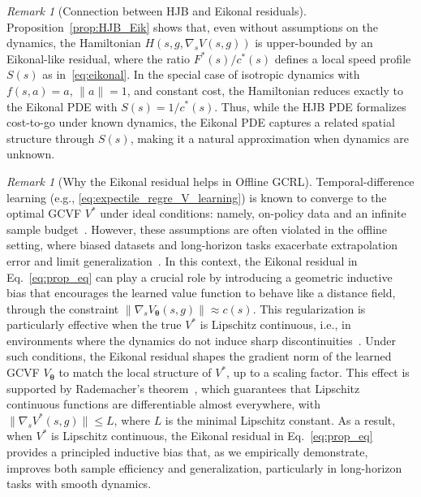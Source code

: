 \documentclass{article}
\theoremstyle{plain}
\theoremstyle{definition}
\theoremstyle{remark}
\newtheorem{remark}[theorem]{Remark}
\begin{document}
\begin{remark}[Connection between HJB and Eikonal residuals]
    Proposition~\ref{prop:HJB_Eik} shows that, even without assumptions on the dynamics, the Hamiltonian \( H(s, g, \nabla_s V(s, g)) \) is upper-bounded by an Eikonal-like residual, where the ratio \( F^*(s) / c^*(s) \) defines a local speed profile \( S(s) \) as in~\eqref{eq:eikonal}. In the special case of isotropic dynamics with \( f(s,a) = a \), \( \|a\| = 1 \), and constant cost, the Hamiltonian reduces exactly to the Eikonal PDE with \( S(s) = 1 / c^*(s) \). Thus, while the HJB PDE formalizes cost-to-go under known dynamics, the Eikonal PDE captures a related spatial structure through \( S(s) \), making it a natural approximation when dynamics are unknown.
\end{remark}

\begin{remark}[Why the Eikonal residual helps in Offline GCRL]
\label{remark_crucial}
    Temporal-difference learning (e.g., \eqref{eq:expectile_regre_V_learning}) is known to converge to the optimal GCVF \( V^* \) under ideal conditions: namely, on-policy data and an infinite sample budget~\cite{sutton2018reinforcement}. However, these assumptions are often violated in the offline setting, where biased datasets and long-horizon tasks exacerbate extrapolation error and limit generalization~\cite{park2024hiql}. In this context, the Eikonal residual in Eq.~\eqref{eq:prop_eq} can play a crucial role by introducing a geometric inductive bias that encourages the learned value function to behave like a distance field, through the constraint \( \|\nabla_s V_{\bm{\theta}}(s, g)\| \approx c(s) \). This regularization is particularly effective when the true \( V^* \) is Lipschitz continuous, i.e., in environments where the dynamics do not induce sharp discontinuities~\cite{banjanin2019nonsmooth}. Under such conditions, the Eikonal residual shapes the gradient norm of the learned GCVF \( V_{\bm{\theta}} \) to match the local structure of \( V^* \), up to a scaling factor. This effect is supported by Rademacher's theorem~\cite{heinonen2005lectures}, which guarantees that Lipschitz continuous functions are differentiable almost everywhere, with \( \|\nabla_s V^*(s, g)\| \leq L \), where \( L \) is the minimal Lipschitz constant. As a result, when $V^*$ is Lipschitz continuous, the Eikonal residual in Eq.~\eqref{eq:prop_eq} provides a principled inductive bias that, as we empirically demonstrate, improves both sample efficiency and generalization, particularly in long-horizon tasks with smooth dynamics.
\end{remark}
\end{document}
